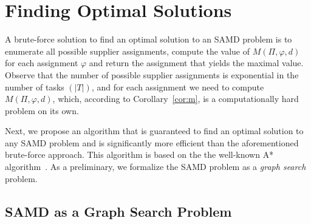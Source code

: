 \documentclass[letterpaper]{article} %
\newtheorem{conjecture}{Conjecture}
\newcommand{\samd}{\ac{SAMD}\xspace}
\newcommand{\astar}{\textsc{A*}\xspace}
\begin{document}


\section{Finding Optimal Solutions}\label{sec:opt}




A brute-force solution to find an optimal solution to an \samd problem is to enumerate all possible supplier assignments,
compute the value of $M(\Pi,\varphi, d)$ for each assignment $\varphi$ and return the assignment that yields the maximal value. Observe that the number of possible supplier assignments is exponential in the number of tasks $(|T|)$, and for each assignment we need to compute $M(\Pi, \varphi, d)$, which, according to Corollary~\ref{cor:m}, is a computationally hard problem on its own.





Next, we propose an algorithm that is guaranteed to find an optimal solution to any \samd problem and is significantly more efficient than the aforementioned brute-force approach. This algorithm is based on the the well-known \astar algorithm~\cite{hart1968formal}. As a preliminary, we formalize the \samd problem as a \emph{graph search} problem.


\subsection{\samd as a Graph Search Problem}
\label{sec:graph}
\end{document}
